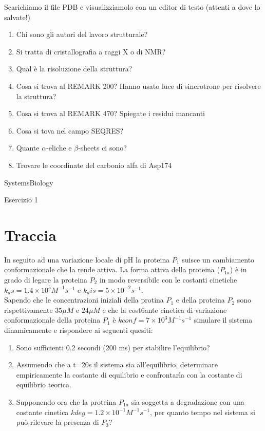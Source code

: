 \documentclass{article}
\begin{document}
Scarichiamo il file PDB e visualizziamolo con un editor di testo (attenti a dove lo salvate!)

\begin{enumerate}
  \item Chi sono gli autori del lavoro strutturale?
  \item Si tratta di cristallografia a raggi X o di NMR?
  \item Qual è la risoluzione della struttura?
  \item Cosa si trova al REMARK 200? Hanno usato luce di
   sincrotrone per risolvere la struttura?
  \item Cosa si trova al REMARK 470? Spiegate i residui mancanti
  \item Cosa si tova nel campo SEQRES?
  \item Quante $\alpha$-eliche e $\beta$-sheets ci sono?
  \item Trovare le coordinate del carbonio alfa di Asp174
\end{enumerate}

\begin{center}
   \Huge
   SystemsBiology
\end{center}
\begin{center}
   \huge
   Esercizio 1
\end{center}

\section*{Traccia}
In seguito ad una variazione locale di pH la proteina $P_1$ suisce un cambiamento conformazionale che la rende attiva. La forma attiva della proteina ($P_{1a}$)
è in grado di legare la proteina $P_2$ in modo reversibile con le costanti cinetiche $k_as = 1.4 \times 10^5 M^{-1}s^{-1}$ e $k_dis = 5 \times 10^{-2}s^{-1}$.\\
Sapendo che le concentrazioni iniziali della protina $P_1$ e della proteina $P_2$ sono rispettivamente $35 \mu M$ e $24 \mu M$ e che la cost6ante cinetica di variazione conformazionale della proteina $P_1$ è $kconf = 7 \times 10^3 M^{-1}s^{-1}$
simulare il sistema dinamicamente e rispondere ai seguenti quesiti:
\begin{enumerate}
   \item Sono sufficienti 0.2 secondi (200 ms) per stabilire l'equilibrio?
   \item Assumendo che a t=20s il sistema sia all'equilibrio, determinare empiricamente la costante di equilibrio e confrontarla con la costante di equilibrio teorica.
   \item Supponendo ora che la proteina $P_{1a}$ sia soggetta a degradazione con una costante cinetica $kdeg=1.2 \times 10^{-1} M^{-1}s^{-1}$, per quanto tempo nel sistema si può rilevare la presenza di $P_3$?
\end{enumerate}
\end{document}
